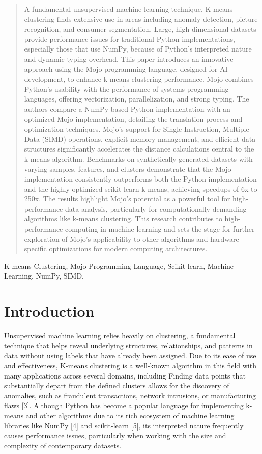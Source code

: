 \documentclass[conference]{IEEEtran}
\begin{document}
\begin{abstract}
A fundamental unsupervised machine learning technique, K-means clustering finds extensive use in areas including anomaly detection, picture recognition, and consumer segmentation. Large, high-dimensional datasets provide performance issues for traditional Python implementations, especially those that use NumPy, because of Python's interpreted nature and dynamic typing overhead. This paper introduces an innovative approach using the Mojo programming language, designed for AI development, to enhance k-means clustering performance. Mojo combines Python's usability with the performance of systems programming languages, offering vectorization, parallelization, and strong typing. The authors compare a NumPy-based Python implementation with an optimized Mojo implementation, detailing the translation process and optimization techniques. Mojo's support for Single Instruction, Multiple Data (SIMD) operations, explicit memory management, and efficient data structures significantly accelerates the distance calculations central to the k-means algorithm. Benchmarks on synthetically generated datasets with varying samples, features, and clusters demonstrate that the Mojo implementation consistently outperforms both the Python implementation and the highly optimized scikit-learn k-means, achieving speedups of 6x to 250x. The results highlight Mojo's potential as a powerful tool for high-performance data analysis, particularly for computationally demanding algorithms like k-means clustering. This research contributes to high-performance computing in machine learning and sets the stage for further exploration of Mojo's applicability to other algorithms and hardware-specific optimizations for modern computing architectures. 
\end{abstract}

\begin{IEEEkeywords}
    K-means Clustering, Mojo Programming Language, Scikit-learn, Machine Learning, NumPy, SIMD.
\end{IEEEkeywords}

\section{Introduction}
Unsupervised machine learning relies heavily on clustering, a fundamental technique that helps reveal underlying structures, relationships, and patterns in data without using labels that have already been assigned. Due to its ease of use and effectiveness, K-means clustering is a well-known algorithm in this field with many applications across several domains, including  
Finding data points that substantially depart from the defined clusters allows for the discovery of anomalies, such as fraudulent transactions, network intrusions, or manufacturing flaws [3]. Although Python has become a popular language for implementing k-means and other algorithms due to its rich ecosystem of machine learning libraries like NumPy [4] and scikit-learn [5], its interpreted nature frequently causes performance issues, particularly when working with the size and complexity of contemporary datasets.
\end{document}
